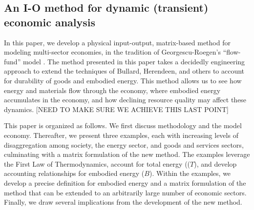 \documentclass[authoryear,preprint,review,12pt]{elsarticle}
\begin{document}
%

\subsection{An I-O method for dynamic (transient) economic analysis}

In this paper, we develop a physical input-output, matrix-based method for modeling multi-sector economies, in the tradition of Georgescu-Roegen's ``flow-fund'' model \cite{G-R1979a, G-R1979b}. The method presented in this paper takes a decidedly engineering approach to extend the techniques of Bullard, Herendeen, and others to account for durability of goods and embodied energy. This method allows us to see how energy and materials flow through the economy, where embodied energy accumulates in the economy, and how declining resource quality may affect these dynamics. [NEED TO MAKE SURE WE ACHIEVE THIS LAST POINT]

This paper is organized as follows. We first discuss methodology and the model economy. Thereafter, we present three examples, each with increasing levels of disaggregation among society, the energy sector, and goods and services sectors, culminating with a matrix formulation of the new method. The examples leverage the First Law of Thermodynamics, account for total energy (($T$), and develop accounting relationships for embodied energy ($B$). Within the examples, we develop a precise definition for embodied energy and a matrix formulation of the method that can be extended to an arbitrarily large number of economic sectors. Finally, we draw several implications from the development of the new method.
\end{document}
